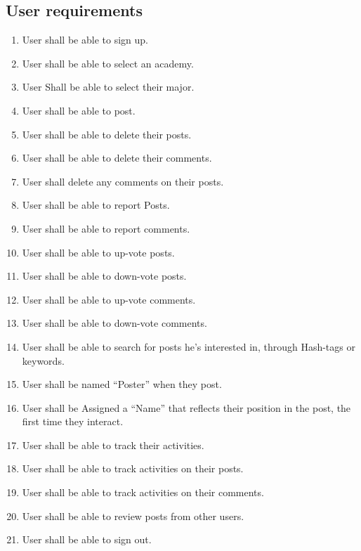 \documentclass[12pt]{article}
\begin{document}
\subsection{User requirements}
\begin{enumerate}
\itemsep0em 
\item User shall be able to sign up.
\item User shall be able to select an academy.
\item User Shall be able to select their major.
\item User shall be able to post.
\item User shall be able to delete their posts.
\item User shall be able to delete their comments.
\item User shall delete any comments on their posts.
\item User shall be able to report Posts.
\item User shall be able to report comments.
\item User shall be able to up-vote posts.
\item User shall be able to down-vote posts.
\item User shall be able to up-vote comments.
\item User shall be able to down-vote comments.
\item User shall be able to search for posts he's interested in, through Hash-tags or keywords.
\item User shall be named “Poster” when they post.
\item User shall be Assigned a “Name” that reflects their position in the post, the first time they interact.
\item User shall be able to track their activities.
\item User shall be able to track activities on their posts.
\item User shall be able to track activities on their comments.
\item User shall be able to review posts from other users.
\item User shall be able to sign out.

\end{enumerate}
\end{document}
